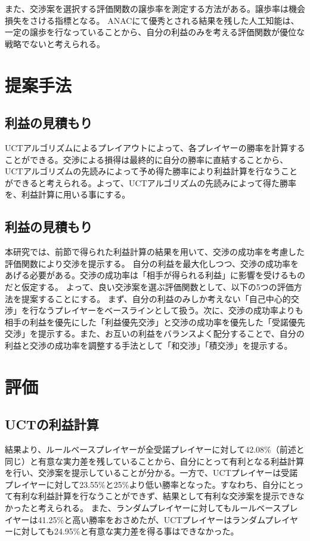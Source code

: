 \documentclass[a4, 10pt,dvipdfmx,twocolumn]{jsarticle}
\begin{document}
また、交渉案を選択する評価関数の譲歩率を測定する方法\cite{baarslag2012evaluating}がある。譲歩率は機会損失をさける指標となる。
ANACにて優秀とされる結果を残した人工知能\cite{baarslag2012evaluating}は、一定の譲歩を行なっていることから、自分の利益のみを考える評価関数が優位な戦略でないと考えられる。

\section{提案手法}
\subsection{利益の見積もり}

UCTアルゴリズムによるプレイアウトによって、各プレイヤーの勝率を計算することができる。交渉による損得は最終的に自分の勝率に直結することから、UCTアルゴリズムの先読みによって予め得た勝率により利益計算を行なうことができると考えられる。よって、UCTアルゴリズムの先読みによって得た勝率を、利益計算に用いる事にする。 

\subsection{利益の見積もり}

本研究では、前節で得られた利益計算の結果を用いて、交渉の成功率を考慮した評価関数により交渉を提示する。
自分の利益を最大化しつつ、交渉の成功率をあげる必要がある。交渉の成功率は「相手が得られる利益」に影響を受けるものだと仮定する。
よって、良い交渉案を選ぶ評価関数として、以下の5つの評価方法を提案することにする。
まず、自分の利益のみしか考えない「自己中心的交渉」を行なうプレイヤーをベースラインとして扱う。次に、交渉の成功率よりも相手の利益を優先にした「利益優先交渉」と交渉の成功率を優先した「受諾優先交渉」を提示する。また、お互いの利益をバランスよく配分することで、自分の利益と交渉の成功率を調整する手法として「和交渉」「積交渉」を提示する。
\section{評価}
\subsection{UCTの利益計算}
結果より、ルールベースプレイヤーが全受諾プレイヤーに対して42.08\%（前述と同じ）と有意な実力差を残していることから、自分にとって有利となる利益計算を行い、交渉案を提示していることが分かる。一方で、UCTプレイヤーは受諾プレイヤーに対して23.55\%と25\%より低い勝率となった。すなわち、自分にとって有利な利益計算を行なうことができず、結果として有利な交渉案を提示できなかったと考えられる。
また、ランダムプレイヤーに対してもルールベースプレイヤーは41.25\%と高い勝率をおさめたが、UCTプレイヤーはランダムプレイヤーに対しても24.95\%と有意な実力差を得る事はできなかった。
\end{document}
